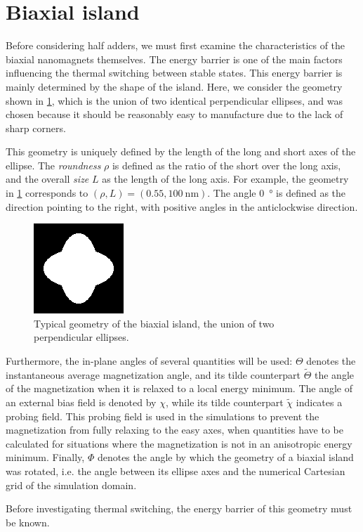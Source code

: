 \documentclass[twocolumn]{phdsymp}
\begin{document}
\section{Biaxial island}
Before considering half adders, we must first examine the characteristics of the biaxial nanomagnets themselves. The energy barrier is one of the main factors influencing the thermal switching between stable states. This energy barrier is mainly determined by the shape of the island. Here, we consider the geometry shown in \cref{fig:EA_geom}, which is the union of two identical perpendicular ellipses, and was chosen because it should be reasonably easy to manufacture due to the lack of sharp corners. \par
This geometry is uniquely defined by the length of the long and short axes of the ellipse. The \textit{roundness} $\rho$ is defined as the ratio of the short over the long axis, and the overall \textit{size} $L$ as the length of the long axis. For example, the geometry in \cref{fig:EA_geom} corresponds to $(\rho,L) = (0.55, \SI{100}{\nano\metre})$. The angle \SI{0}{\degree} is defined as the direction pointing to the right, with positive angles in the anticlockwise direction. \par
\begin{figure}
    \centering
    \includegraphics[width=0.4\columnwidth]{Figures/geomPlus55.png}
    \caption{Typical geometry of the biaxial island, the union of two perpendicular ellipses.}
    \label{fig:EA_geom}
\end{figure}
Furthermore, the in-plane angles of several quantities will be used: $\Theta$ denotes the instantaneous average magnetization angle, and its tilde counterpart $\widetilde{\Theta}$ the angle of the magnetization when it is relaxed to a local energy minimum. The angle of an external bias field is denoted by $\chi$, while its tilde counterpart $\widetilde{\chi}$ indicates a probing field. This probing field is used in the simulations to prevent the magnetization from fully relaxing to the easy axes, when quantities have to be calculated for situations where the magnetization is not in an anisotropic energy minimum. Finally, $\Phi$ denotes the angle by which the geometry of a biaxial island was rotated, i.e. the angle between its ellipse axes and the numerical Cartesian grid of the simulation domain. \par %
Before investigating thermal switching, the energy barrier of this geometry must be known.
\end{document}
